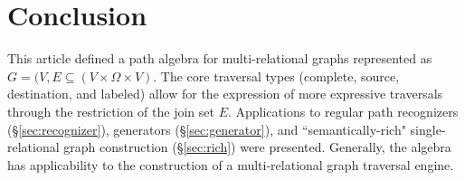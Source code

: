 \documentclass[10pt,conference,letterpaper]{IEEEtran}
\begin{document}
\section{Conclusion}

This article defined a path algebra for multi-relational graphs represented as $G = (V,E \subseteq (V \times \Omega \times V)$. The core traversal types (complete, source, destination, and labeled) allow for the expression of more expressive traversals through the restriction of the join set $E$. Applications to regular path recognizers (\S \ref{sec:recognizer}), generators (\S \ref{sec:generator}), and ``semantically-rich" single-relational graph construction (\S \ref{sec:rich}) were presented. Generally, the algebra has applicability to the construction of a multi-relational graph traversal engine.

\vfill
\end{document}
